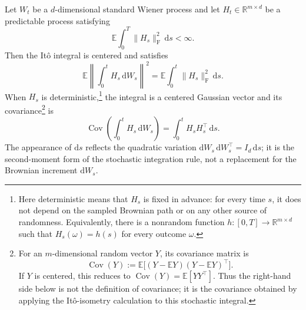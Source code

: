 \documentclass[11pt,a4paper]{article}
\theoremstyle{definition}
\begin{document}
\begin{theorem}[It\^o isometry]
Let $W_t$ be a $d$-dimensional standard Wiener process and let
$H_t\in\mathbb{R}^{m\times d}$ be a predictable process satisfying
\[
\mathbb{E}\int_0^T\lVert H_s\rVert_{\mathrm{F}}^2\,\mathrm{d}s<\infty.
\]
Then the It\^o integral is centered and satisfies
\[
\mathbb{E}\left\|
\int_0^t H_s\,\mathrm{d}W_s
\right\|^2
=
\mathbb{E}\int_0^t\lVert H_s\rVert_{\mathrm{F}}^2\,\mathrm{d}s.
\]
When $H_s$ is deterministic,\footnote{Here deterministic means that $H_s$ is fixed in
advance: for every time $s$, it does not depend on the sampled Brownian path or on any other
source of randomness. Equivalently, there is a nonrandom function $h:[0,T]\to
\mathbb{R}^{m\times d}$ such that $H_s(\omega)=h(s)$ for every outcome $\omega$.} the
integral is a centered Gaussian vector and its covariance\footnote{For an
$m$-dimensional random vector $Y$, its covariance matrix is
\[
\operatorname{Cov}(Y)
:=\mathbb{E}\bigl[(Y-\mathbb{E}Y)(Y-\mathbb{E}Y)^\top\bigr].
\]
If $Y$ is centered, this reduces to $\operatorname{Cov}(Y)=\mathbb{E}[YY^\top]$.
Thus the right-hand side below is not the definition of covariance; it is the covariance
obtained by applying the It\^o-isometry calculation to this stochastic integral.} is
\[
\operatorname{Cov}\left(\int_0^t H_s\,\mathrm{d}W_s\right)
=\int_0^t H_sH_s^{\top}\,\mathrm{d}s.
\]
The appearance of $\mathrm{d}s$ reflects the quadratic variation
$\mathrm{d}W_s\,\mathrm{d}W_s^{\top}=I_d\,\mathrm{d}s$; it is the second-moment form of
the stochastic integration rule, not a replacement for the Brownian increment
$\mathrm{d}W_s$.
\end{theorem}
\end{document}
